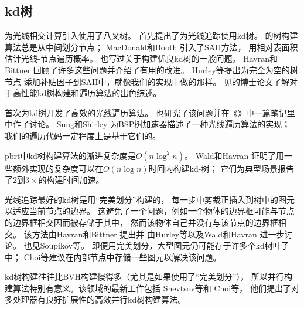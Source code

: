 \subsection{kd树}\label{sub:kd树}
\citet{6429331}为光线相交计算引入使用了八叉树。
\citet{kaplan1985use}首先提出了为光线追踪使用kd树。
\citeauthor{kaplan1985use}的树构建算法总是从中间划分节点；
MacDonald和Booth \parencite*{MacDonald1990}引入了SAH方法，
用相对表面积估计光线-节点遍历概率。
\citet{Naylor1993:27}也写过关于构建优良kd树的一般问题。
Havran和Bittner \parencite*{HavranImproving2002}回顾了许多这些问题并介绍了有用的改进。
Hurley等\parencite*{hurley2002fast}提出为完全为空的树节点
添加补贴因子到SAH中，就像我们的实现中做的那样。
见\citet{Havran2000:PhD}的博士论文了解对于高性能kd树构建和遍历算法的出色综述。


\citet{10.1007/978-3-642-71071-1_4}首次为kd树开发了高效的光线遍历算法。
\citet{ArvoRay1988}也研究了该问题并在《{\itshape{}}》中一篇笔记里中作了讨论。
Sung和Shirley \parencite*{SUNG1992271}为BSP树加速器描述了一种光线遍历算法的实现；
我们的遍历代码一定程度上是基于它们的。

pbrt中kd树构建算法的渐进复杂度是$O(n\log^2n)$。
Wald和Havran \parencite*{4061547}证明了用一些额外实现的复杂度可以在$O(n\log n)$时间内构建kd-树；
它们为典型场景报告了$2$到$3\times$的构建时间加速。

光线追踪最好的kd树是用“完美划分”构建的，
每一步中剪裁正插入到树中的图元以适应当前节点的边界。
这避免了一个问题，例如一个物体的边界框可能与节点的边界框相交因而被存储于其中，
然而该物体自己并没有与该节点的边界框相交。
该方法由Havran和Bittner \parencite*{HavranImproving2002}提出并
由Hurley等\parencite*{hurley2002fast}以及Wald和Havran \parencite*{4061547}进一步讨论。
也见Soupikov等\parencite*{4634623}。
即便用完美划分，大型图元仍可能存于许多个kd树叶子中；
Choi等\parencite*{10.1111/cgf.12241}建议在内部节点中存储一些图元以解决该问题。

kd树构建往往比BVH构建慢得多（尤其是如果使用了“完美划分”），
所以并行构建算法特别有意义。该领域的最新工作包括
Shevtsov等\parencite*{10.1111/j.1467-8659.2007.01062.x}和
Choi等\parencite*{10.5555/1921479.1921492}，
他们提出了对多处理器有良好扩展性的高效并行kd树构建算法。

